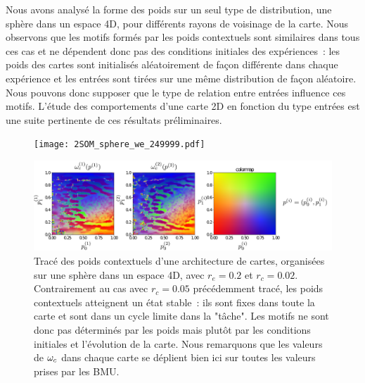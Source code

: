 \documentclass[../main]{subfiles}
\begin{document}
Nous avons analysé la forme des poids sur un seul type de distribution, une sphère dans un espace 4D, pour différents rayons de voisinage de la carte.
Nous observons que les motifs formés par les poids contextuels sont similaires dans tous ces cas et ne dépendent donc pas des conditions initiales des expériences~: les poids des cartes sont initialisés aléatoirement de façon différente dans chaque expérience et les entrées sont tirées sur une même distribution de façon aléatoire.
Nous pouvons donc supposer que le type de relation entre entrées influence ces motifs. L'étude des comportements d'une carte 2D en fonction du type entrées est une suite pertinente de ces résultats préliminaires.


\begin{figure}
	\begin{minipage}{\textwidth}
		\centering\texttt{[image: 2SOM\_sphere\_we\_249999.pdf]}
	\end{minipage}
	\begin{minipage}{\textwidth}
		\centering\includegraphics[width=\textwidth]{wc_s_002_legend.pdf}
		\caption{Tracé des poids contextuels d'une architecture de cartes, organisées sur une sphère dans un espace 4D, avec $r_e =0.2$ et $r_c = 0.02$. Contrairement au cas avec $r_c = 0.05$ précédemment tracé, les poids contextuels atteignent un état stable~: ils sont fixes dans toute la carte et sont dans un cycle limite dans la "tâche". Les motifs ne sont donc pas déterminés par les poids mais plutôt par les conditions initiales et l'évolution de la carte. Nous remarquons que les valeurs de $\omega_c$ dans chaque carte se déplient bien ici sur toutes les valeurs prises par les BMU.
		\label{fig:2som_s_002_wc}}
	\end{minipage}
\end{figure}
\end{document}
